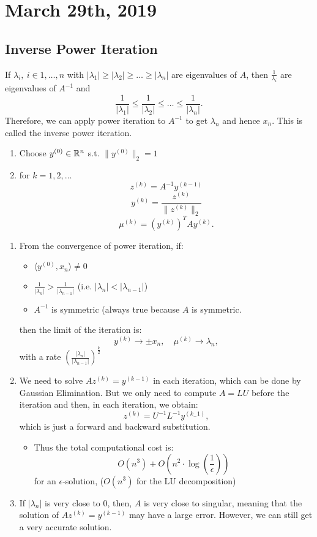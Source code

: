\documentclass[../main/main.tex]{subfiles}
\begin{document}
\section{March 29th, 2019}
\subsection{Inverse Power Iteration}
If $\lambda_i,\ i\in 1,\ldots,n$ with $|\lambda_1|\ge |\lambda_2|\ge \ldots\ge |\lambda_n|$ are eigenvalues of $A$, then  $\frac{1}{\lambda_i}$ are eigenvalues of $A^{-1}$ and \[
\frac{1}{|\lambda_1|}\le \frac{1}{|\lambda_2|}\le \ldots\le \frac{1}{|\lambda_n|}
.\]  Therefore, we can apply power iteration to $A^{-1}$ to get $\lambda_n$ and hence $x_n$. This is called the inverse power iteration.
\begin{algo}
	\begin{enumerate}
		\item Choose $y^{(0)}\in \mathbb{R}^{n}$ s.t. $\|y^{(0)}\|_2=1$
		\item for $k=1,2,\ldots$
			\[
				z^{(k)}=A^{-1}y^{(k-1)}
			\]\[
			y^{(k)}=\frac{z^{(k)}}{\|z^{(k)}\|_2}
			\]\[
			\mu^{(k)}=\left( y^{(k)} \right)^{T}Ay^{(k)} 
			.\]  
	\end{enumerate}
\end{algo}
\begin{remark}
	\begin{enumerate}
		\item From the convergence of power iteration, if: 
			\begin{itemize}
				\item $\langle y^{(0)},x_n\rangle\neq 0$ 
				\item $\frac{1}{|\lambda_n|}>\frac{1}{|\lambda_{n-1}|}$ (i.e. $|\lambda_n|<|\lambda_{n-1}|$)
				\item $A^{-1}$ is symmetric (always true because $A$ is symmetric.
			\end{itemize}
			then the limit of the iteration is: \[
				y^{(k)}\to \pm x_n, \quad \mu^{(k)}\to \lambda_n
			,\] with a rate $\left( \frac{\left| \lambda_n \right|}{\left| \lambda_{n-1} \right|}  \right)^{\frac{k}{2}} $
\item We need to solve $Az^{(k)}=y^{(k-1)}$ in each iteration, which can be done by Gaussian Elimination. But we only need to compute $A=LU$ before the iteration and then, in each iteration, we obtain: \[
		z^{(k)}=U^{-1}L^{-1}y^{(k_-1)}
,\] which is just a forward and backward substitution. 
\begin{itemize}
	\item  Thus the total computational cost is: \[
			O(n^3)+O\left(n^2\cdot \log\left( \frac{1}{\epsilon} \right) \right)
		\] for an $\epsilon$-solution, ($O(n^3)$ for the LU decomposition)
\end{itemize}
\item If $|\lambda_n|$ is very close to 0, then, $A$ is very close to singular, meaning that the solution of $Az^{(k)}=y^{\left( k-1 \right) }$ may have a large error. However, we can still get a very accurate solution.
\end{enumerate}
\end{remark}
\end{document}
